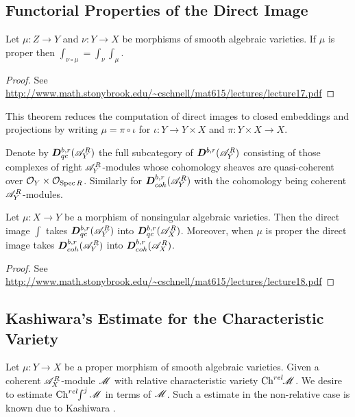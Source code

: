         \subsection{Functorial Properties of the Direct Image}
        \begin{theorem}
           Let $\mu:Z\to Y$ and $\nu:Y\to X$ be morphisms of smooth algebraic varieties. If $\mu$ is proper then $\int_{\nu\circ \mu} = \int_\nu \int_\mu$.
        \end{theorem}
        \begin{proof}
          See \url{http://www.math.stonybrook.edu/~cschnell/mat615/lectures/lecture17.pdf}
        \end{proof}
        This theorem reduces the computation of direct images to closed embeddings and projections by writing $\mu = \pi \circ \iota$ for $\iota:Y\to Y\times X$ and $\pi:Y\times X\to X$.



    Denote by $\boldsymbol{D}^{b,r}_{qc}(\mathscr{A}_Y^{R})$ the full subcategory of $\boldsymbol{D}^{b,r}(\mathscr{A}_Y^R)$ consisting of those complexes of right $\mathscr{A}_Y^R$-modules whose cohomology sheaves are quasi-coherent over $\mathcal{O}_Y\times \mathcal{O}_{\operatorname{Spec} R}$. Similarly for $\boldsymbol{D}^{b,r}_{coh}(\mathscr{A}_Y^R)$ with the cohomology being coherent $\mathscr{A}_Y^R$-modules.
    \begin{theorem}\label{thm: ConservationQuasiCoherentAndCoherentIfProper}
        Let $\mu:X\to Y$ be a morphism of nonsingular algebraic varieties. Then the direct image $\int$ takes $\boldsymbol{D}^{b,r}_{qc}(\mathscr{A}_Y^{R})$ into $\boldsymbol{D}^{b,r}_{qc}(\mathscr{A}_X^{R})$. Moreover, when $\mu$ is proper the direct image takes $\boldsymbol{D}^{b,r}_{coh}(\mathscr{A}_Y^R)$ into $\boldsymbol{D}^{b,r}_{coh}(\mathscr{A}_X^R)$.
    \end{theorem}
    \begin{proof}
      See \url{http://www.math.stonybrook.edu/~cschnell/mat615/lectures/lecture18.pdf}
    \end{proof}
\subsection{Kashiwara's Estimate for the Characteristic Variety}
Let $\mu:Y\to X$ be a proper morphism of smooth algebraic varieties. Given a coherent $\mathscr{A}_X^R$-module $\mathscr{M}$ with relative characteristic variety $\operatorname{Ch}^{rel}\mkern-5mu \mathscr{M}$. We desire to estimate $\operatorname{Ch}^{rel}\mkern-5mu \int^j \mathscr{M}$ in terms of $\mathscr{M}$. Such a estimate in the non-relative case is known due to Kashiwara \cite{kashiwara1976b}. %

